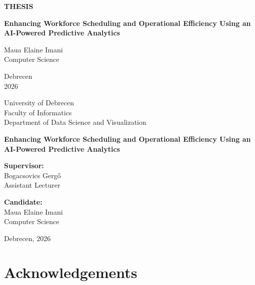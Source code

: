 \documentclass[12pt,a4paper]{report}
\begin{document}
\begin{titlepage}
\centering
\vspace*{3cm}
{\LARGE\bfseries THESIS\par}
\vspace{5cm}
{\Large\bfseries Enhancing Workforce Scheduling and Operational Efficiency Using an AI-Powered Predictive Analytics\par}
\vfill
\begin{flushright}
    {\large Maua Elaine Imani}\\[4pt]
    {\normalsize Computer Science}
\end{flushright}
\vspace{2cm}
{\large Debrecen}\\[4pt]
{\large 2026}
\end{titlepage}

\begin{titlepage}
\centering
{\large University of Debrecen\\Faculty of Informatics\\Department of Data Science and Visualization\par}
\vspace{2.5cm}
{\LARGE\bfseries Enhancing Workforce Scheduling and Operational Efficiency Using an AI-Powered Predictive Analytics\par}
\vspace{3cm}
\begin{minipage}[t]{0.48\textwidth}
\raggedright
    \textbf{Supervisor:}\\
    Bogacsovics Gergő\\
    Assistant Lecturer
\end{minipage}
\hfill
\begin{minipage}[t]{0.48\textwidth}
\raggedleft
    \textbf{Candidate:}\\
    Maua Elaine Imani\\
    Computer Science
\end{minipage}
\vfill
{\large Debrecen, 2026}
\end{titlepage}

\chapter*{Acknowledgements}
\end{document}
